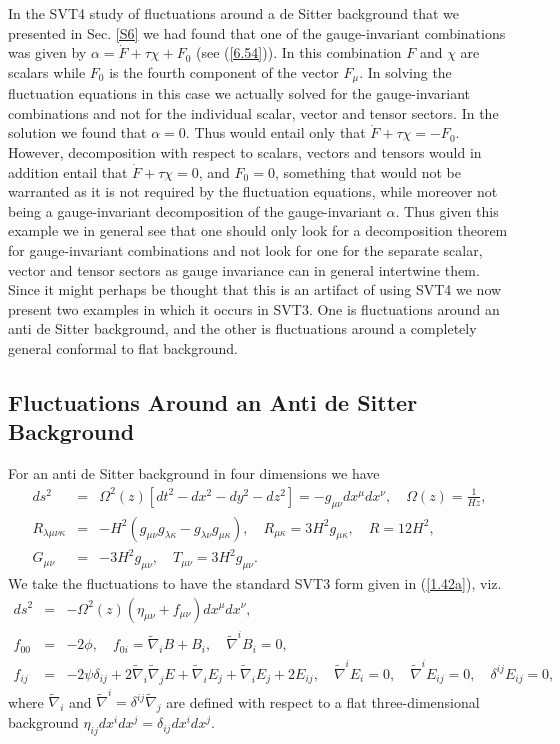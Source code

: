 \documentclass[aps,onecolumn,10pt]{revtex4}
\numberwithin{equation}{section}
\numberwithin{equation}{section}
\begin{document}
In the SVT4 study of fluctuations around a de Sitter background that we presented in Sec. \ref{S6} we had found that one of the gauge-invariant combinations was given by $\alpha=\dot{F}+\tau \chi +F_0$ (see (\ref{6.54})). In this combination $F$ and $\chi$ are scalars while $F_0$ is the fourth component of the vector $F_{\mu}$. In solving the fluctuation equations in this case we actually solved for the gauge-invariant combinations and not for the individual scalar, vector and tensor sectors. In the solution we found that $\alpha=0$.  Thus would entail only that  $\dot{F}+\tau \chi =-F_0$. However, decomposition with respect to scalars, vectors and tensors would in addition entail that $\dot{F}+\tau \chi=0$, and $F_0=0$, something that would not be warranted as it is not required by the fluctuation equations, while moreover not being a gauge-invariant decomposition of the 
gauge-invariant $\alpha$. Thus given this example we in general see that one should only look for a decomposition theorem for gauge-invariant combinations and not look for one for the separate scalar, vector and tensor sectors as gauge invariance can in general intertwine them. Since it might perhaps be thought that this is an artifact of using SVT4 we now present two examples in which it occurs in SVT3. One is fluctuations around an anti de Sitter background, and the other is fluctuations around a completely general conformal to flat background.

\subsection{Fluctuations Around an Anti de Sitter Background}
\label{S14a}
For an anti de Sitter background in four dimensions we have
%
\begin{eqnarray}
ds^2 &=& \Omega^2(z)\left[ dt^2 - dx^2-dy^2-dz^2\right]= -g_{\mu\nu}dx^{\mu} dx^{\nu},\quad
\Omega(z) = \frac{1}{Hz},
\nonumber\\
R_{\lambda\mu\nu\kappa} &=& -H^2(g_{\mu\nu}g_{\lambda\kappa} -g_{\lambda\nu}g_{\mu\kappa}),
\quad R_{\mu\kappa} =3H^2 g_{\mu\kappa},\quad R = 12H^2,
\nonumber\\
G_{\mu\nu} &=& -3H^2 g_{\mu\nu},\quad T_{\mu\nu} = 3H^2 g_{\mu\nu}.
\label{14.1}
\end{eqnarray}
%
We take the fluctuations to have the standard SVT3 form given in (\ref{1.42a}), viz. 
%
\begin{eqnarray}
ds^2 &=&- \Omega^2(z)\left( \eta_{\mu\nu}+ f_{\mu\nu}\right) dx^\mu dx^\nu,
\nonumber\\
f_{00} &=& -2 \phi,\quad f_{0i} = \tilde\nabla_i B + B_i,\quad \tilde{\nabla}^iB_i=0,
\nonumber\\
f_{ij} &=& -2 \psi \delta_{ij} + 2\tilde\nabla_i\tilde\nabla_j E + \tilde\nabla_i E_j
+ \tilde\nabla_i E_j + 2E_{ij},\quad \tilde{\nabla}^iE_i=0,\quad \tilde{\nabla}^iE_{ij}=0,\quad \delta^{ij}E_{ij}=0, 
\label{14.2}
\end{eqnarray}
%
where $\tilde{\nabla}_i$ and $\tilde{\nabla}^i=\delta^{ij}\tilde{\nabla}_j$ are defined with respect to a flat three-dimensional background $\eta_{ij}dx^idx^j=\delta_{ij}dx^idx^j$.
\end{document}
